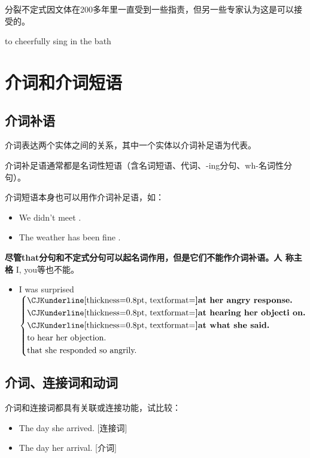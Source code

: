 分裂不定式因文体在200多年里一直受到一些指责，但另一些专家认为这是可以接受的。

to cheerfully sing in the bath
\section{介词和介词短语}

\subsection{介词补语}

介词表达两个实体之间的关系，其中一个实体以介词补足语为代表。

介词补足语通常都是名词性短语（含名词短语、代词、-ing分句、wh-名词性分句）。

介词短语本身也可以用作介词补足语，如：
\begin{itemize}
\item We didn't meet .

\item The weather has been fine .
\end{itemize}

\textbf{尽管that分句和不定式分句可以起名词作用，但是它们不能作介词补语。}\textbf{人
称主格} I, you等也不能。

\begin{itemize}
\item I was surprised $ \left\{
    \begin{aligned}
     &\text{\unbf{at} her angry response.}\\
     &\text{\unbf{at} hearing her objecti on.}\\
     &\text{\unbf{at} what she said.}\\
     &\text{to hear her objection.}\\
     &\text{that she responded so angrily. }
    \end{aligned}
  \right. $

\end{itemize}

\subsection{介词、连接词和动词}
\label{subsec:prepconn}

介词和连接词都具有关联或连接功能，试比较：
\begin{itemize}
\item The day  she arrived. [连接词]
\item The day  her arrival. [介词]
\end{itemize}

